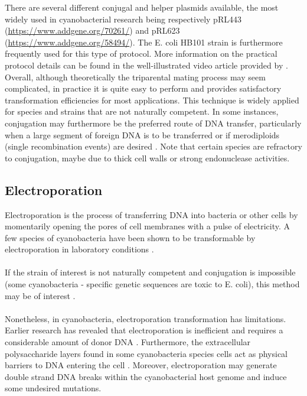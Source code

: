 \noindent
There are several different conjugal and helper plasmids available, the most widely used in cyanobacterial research being respectively pRL443 (\href{https://www.addgene.org/70261/}{https://www.addgene.org/70261/}) and pRL623 (\href{https://www.addgene.org/58494/}{https://www.addgene.org/58494/}). The E. coli HB101 strain is furthermore frequently used for this type of protocol. More information on the practical protocol details can be found in the well-illustrated video article provided by \parencite{Gale2019}.
Overall, although theoretically the triparental mating process may seem complicated, in practice it is quite easy to perform and provides satisfactory transformation efficiencies for most applications. This technique is widely applied for species and strains that are not naturally competent. In some instances, conjugation may furthermore be the preferred route of DNA transfer, particularly when a large segment of foreign DNA is to be transferred or if merodiploids (single recombination events) are desired \parencite{Yu2015}. Note that certain species are refractory to conjugation, maybe due to thick cell walls or strong endonuclease activities.



\subsection{Electroporation}

Electroporation is the process of transferring DNA into bacteria or other cells by momentarily opening the pores of cell membranes with a pulse of electricity. A few species of cyanobacteria have been shown to be transformable by electroporation in laboratory conditions \parencite{Koksharova2002} \parencite{Stucken2012} \parencite{Tsujimoto2015}. \\ \\
If the strain of interest is not naturally competent and conjugation is impossible (some cyanobacteria - specific genetic sequences are toxic to E. coli), this method may be of interest \parencite{Wendt2019}. \\ \\
Nonetheless, in cyanobacteria, electroporation transformation has limitations. Earlier research has revealed that electroporation is inefficient and requires a considerable amount of donor DNA \parencite{Toyomizu2001}. Furthermore, the extracellular polysaccharide layers found in some cyanobacteria species cells act as physical barriers to DNA entering the cell \parencite{Wendt2019}. Moreover, electroporation may generate double strand DNA breaks within the cyanobacterial host genome and induce some undesired mutations.





